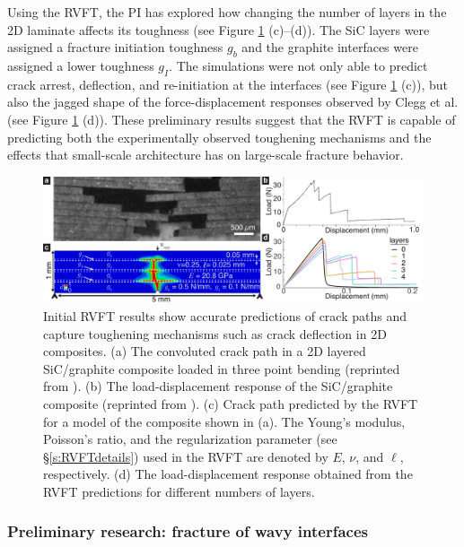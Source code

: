 \documentclass[10pt,letterpaper]{article}
\begin{document}
      Using the RVFT, the PI has explored how changing the number of layers in the 2D laminate affects its toughness (see Figure \ref{f:sim} (c)--(d)). The SiC layers were assigned a fracture initiation toughness $g_{b}$ and the graphite interfaces were assigned a lower toughness $g_{I}$. The simulations were not only able to predict crack arrest, deflection, and re-initiation at the interfaces (see Figure \ref{f:sim} (c)), but also the jagged shape of the force-displacement responses observed by Clegg et al. (see Figure \ref{f:sim} (d)). These preliminary results suggest that the RVFT is capable of predicting both the experimentally observed toughening mechanisms and the effects that small-scale architecture has on large-scale fracture behavior.
%
      \begin{figure}[h!]
             \centering
               \includegraphics[width=\textwidth, trim={0 0.0cm 0.0cm 0}, clip]{Figures/Introduction/CrackPathSim_V1.pdf}
               \caption{ \footnotesize Initial RVFT results show accurate predictions of crack paths and capture toughening mechanisms such as crack deflection in 2D composites. (a) The convoluted crack path in a 2D layered SiC/graphite composite loaded in three point bending (reprinted from \cite{clegg1990simple}). (b) The load-displacement response of the SiC/graphite composite (reprinted from \cite{clegg1990simple}). (c) Crack path predicted by the RVFT for a model of the composite shown in (a). The Young's modulus, Poisson's ratio, and the regularization parameter (see \S \ref{s:RVFTdetails}) used in the RVFT are denoted by $E$, $\nu$, and $\ell$, respectively. (d) The load-displacement response obtained from the RVFT predictions for different numbers of layers.
                 }
               \label{f:sim}
      \end{figure}

    \subsubsection{Preliminary research: fracture of wavy interfaces}
\end{document}
